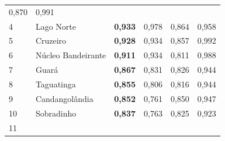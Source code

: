\begin{table}[h!]
{\begin{tabular}{llllll}
            {\color[HTML]{202122} 0,870} &
            {\color[HTML]{202122} 0,991} \\
            \rowcolor[HTML]{F8F9FA}
            {\color[HTML]{202122} 4} &
            {\color[HTML]{202122} Lago Norte} &
            {\color[HTML]{202122} \textbf{0,933}} &
            {\color[HTML]{202122} 0,978} &
            {\color[HTML]{202122} 0,864} &
            {\color[HTML]{202122} 0,958} \\
            \rowcolor[HTML]{F8F9FA}
            {\color[HTML]{202122} 5} &
            {\color[HTML]{202122} Cruzeiro} &
            {\color[HTML]{202122} \textbf{0,928}} &
            {\color[HTML]{202122} 0,934} &
            {\color[HTML]{202122} 0,857} &
            {\color[HTML]{202122} 0,992} \\
            \rowcolor[HTML]{F8F9FA}
            {\color[HTML]{202122} 6} &
            {\color[HTML]{202122} Núcleo Bandeirante} &
            {\color[HTML]{202122} \textbf{0,911}} &
            {\color[HTML]{202122} 0,934} &
            {\color[HTML]{202122} 0,811} &
            {\color[HTML]{202122} 0,988} \\
            \rowcolor[HTML]{F8F9FA}
            {\color[HTML]{202122} 7} &
            {\color[HTML]{202122} Guará} &
            {\color[HTML]{202122} \textbf{0,867}} &
            {\color[HTML]{202122} 0,831} &
            {\color[HTML]{202122} 0,826} &
            {\color[HTML]{202122} 0,944} \\
            \rowcolor[HTML]{F8F9FA}
            {\color[HTML]{202122} 8} &
            {\color[HTML]{202122} Taguatinga} &
            {\color[HTML]{202122} \textbf{0,855}} &
            {\color[HTML]{202122} 0,806} &
            {\color[HTML]{202122} 0,816} &
            {\color[HTML]{202122} 0,944} \\
            \rowcolor[HTML]{F8F9FA}
            {\color[HTML]{202122} 9} &
            {\color[HTML]{202122} Candangolândia} &
            {\color[HTML]{202122} \textbf{0,852}} &
            {\color[HTML]{202122} 0,761} &
            {\color[HTML]{202122} 0,850} &
            {\color[HTML]{202122} 0,947} \\
            \rowcolor[HTML]{F8F9FA}
            {\color[HTML]{202122} 10} &
            {\color[HTML]{202122} Sobradinho} &
            {\color[HTML]{202122} \textbf{0,837}} &
            {\color[HTML]{202122} 0,763} &
            {\color[HTML]{202122} 0,825} &
            {\color[HTML]{202122} 0,923} \\
            \rowcolor[HTML]{F8F9FA}
            {\color[HTML]{202122} 11} &

\end{tabular}}
\end{table}
